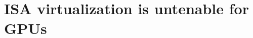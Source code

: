 \chapter{ISA virtualization is untenable for GPUs}
\label{sec:trillium}

\def\gpuvmdef{\textsc{GPU\-vm-default}\xspace}
\def\gpuvmopt{\textsc{GPU\-vm-opt}\xspace}
\def\XenSVGA{\textsc{Xen-SVGA}\xspace}
\def\Trillium{\textsc{{T}rillium}\xspace}
\def\apigpu{\textsc{API-remote-GPU}\xspace}
\def\apicpu{\textsc{API-remote-CPU}\xspace}
\def\shadowpipe{\texttt{shadow-pipe}\xspace}
\def\Shadowpipe{\texttt{Shadow-pipe}\xspace}
\def\vframework{\textsc{{IEMTS}}\xspace}





